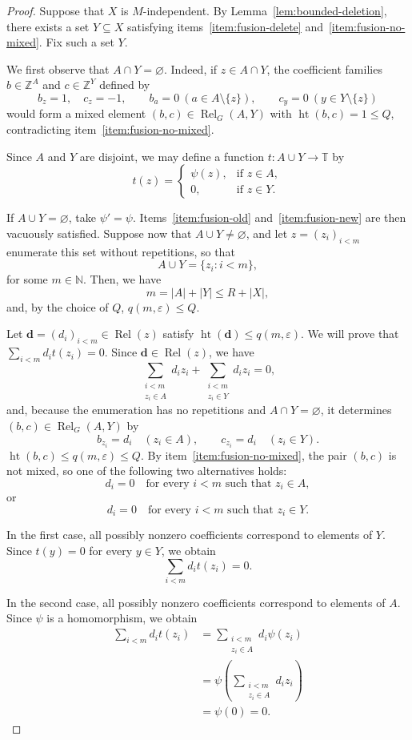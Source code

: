 \documentclass[10pt,a4paper]{amsart}
\newcommand{\T}{\mathbb T}
\newcommand{\N}{\mathbb N}
\newcommand{\Z}{\mathbb Z}
\newcommand{\Rel}{\operatorname{Rel}}
\newcommand{\htop}{\operatorname{ht}}
\begin{document}
\begin{proof}
Suppose that $X$ is $M$-independent. By
Lemma~\ref{lem:bounded-deletion}, there exists a set $Y\subseteq X$
satisfying items~\ref{item:fusion-delete}
and~\ref{item:fusion-no-mixed}.  Fix such a set $Y$.

We first observe that $A\cap Y=\varnothing$. Indeed, if $z\in A\cap Y$, the
coefficient families $b\in\Z^A$ and $c\in\Z^Y$ defined by
\[
 b_z=1,\quad c_z=-1,
 \qquad b_a=0\ (a\in A\setminus\{z\}),
 \qquad c_y=0\ (y\in Y\setminus\{z\})
\]
would form a mixed element $(b,c)\in\Rel_G(A,Y)$ with
$\htop(b,c)=1\leq Q$, contradicting
item~\ref{item:fusion-no-mixed}.

Since $A$ and $Y$ are disjoint, we may define a function
$t:A\cup Y\to\T$ by
\[
t(z)=
\begin{cases}
\psi(z),&\text{if }z\in A,\\
0,&\text{if }z\in Y.
\end{cases}
\]

If $A\cup Y=\varnothing$, take $\psi'=\psi$.  Items~\ref{item:fusion-old}
and~\ref{item:fusion-new} are then vacuously
satisfied.  Suppose now that $A\cup Y\neq\varnothing$, and let
$z=(z_i)_{i<m}$ enumerate this set without repetitions, so that
\[
A\cup Y=\{z_i:i<m\},
\]
for some $m\in\N$. Then, we have
\[
m=|A|+|Y|\leq R+|X|,
\]
and, by the choice of $Q$, $q(m,\varepsilon)\leq Q$.

Let $\mathbf d=(d_i)_{i<m}\in\Rel(z)$ satisfy
$\htop(\mathbf d)\leq q(m,\varepsilon)$. We will prove that
$\sum_{i<m}d_i t(z_i)=0$.  Since $\mathbf d\in\Rel(z)$, we have
\[
\sum_{\substack{i<m\\z_i\in A}}d_i z_i
+
\sum_{\substack{i<m\\z_i\in Y}}d_i z_i
=0,
\]
and, because the enumeration has no repetitions and $A\cap Y=\varnothing$,
it determines $(b,c)\in\Rel_G(A,Y)$ by
\[
 b_{z_i}=d_i\quad(z_i\in A),
 \qquad
 c_{z_i}=d_i\quad(z_i\in Y).
\]
$\htop(b,c)\leq q(m,\varepsilon)\leq Q$.  By
item~\ref{item:fusion-no-mixed}, the pair
$(b,c)$ is not mixed, so one of the following two alternatives holds:
\[
d_i=0\quad\text{for every $i<m$ such that $z_i\in A$},
\]
or
\[
d_i=0\quad\text{for every $i<m$ such that $z_i\in Y$}.
\]

In the first case, all possibly nonzero coefficients correspond to
elements of $Y$. Since $t(y)=0$ for every $y\in Y$, we obtain
\[
\sum_{i<m}d_i t(z_i)=0.
\]

In the second case, all possibly nonzero coefficients correspond to
elements of $A$. Since $\psi$ is a homomorphism, we obtain
\[
\begin{aligned}
\sum_{i<m}d_i t(z_i)
&=
\sum_{\substack{i<m\\z_i\in A}}d_i\psi(z_i)\\
&=
\psi\left(
\sum_{\substack{i<m\\z_i\in A}}d_i z_i
\right)\\
&=\psi(0)=0.
\end{aligned}
\]


\end{proof}
\end{document}

